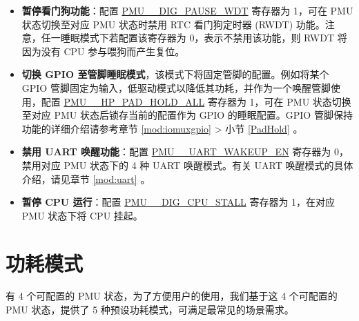 \documentclass[main\_\_CN.tex]{subfiles}
\begin{document}
\begin{itemize}
    \item \textbf{暂停看门狗功能}：配置 \hyperref[fielddesc:PMUHPACTIVEDIGPAUSEWDT]{PMU\_\_DIG\_PAUSE\_WDT} 寄存器为 1，可在 PMU 状态切换至对应 PMU 状态时禁用 RTC 看门狗定时器 (RWDT) 功能。注意，任一睡眠模式下若配置该寄存器为 0，表示不禁用该功能，则 RWDT 将因为没有 CPU 参与喂狗而产生复位。

    \item \textbf{切换 GPIO 至管脚睡眠模式}，该模式下将固定管脚的配置。例如将某个 GPIO 管脚固定为输入，低驱动模式以降低其功耗，并作为一个唤醒管脚使用，配置 \hyperref[fielddesc:PMUHPACTIVEHPPADHOLDALL]{PMU\_\_HP\_PAD\_HOLD\_ALL} 寄存器为 1，可在 PMU 状态切换至对应 PMU 状态后锁存当前的配置作为 GPIO 的睡眠配置。GPIO 管脚保持功能的详细介绍请参考章节 \ref{mod:iomuxgpio} \textit{} > 小节 \ref{PadHold} \textit{}。

    \item \textbf{禁用 UART 唤醒功能}：配置 \hyperref[fielddesc:PMUHPACTIVEUARTWAKEUPEN]{PMU\_\_UART\_WAKEUP\_EN} 寄存器为 0，禁用对应 PMU 状态下的 4 种 UART 唤醒模式。有关 UART 唤醒模式的具体介绍，请见章节 \ref{mod:uart} \textit{}。

    \item \textbf{暂停 CPU 运行}：配置 \hyperref[fielddesc:PMUHPACTIVEDIGCPUSTALL]{PMU\_\_DIG\_CPU\_STALL} 寄存器为 1，在对应 PMU 状态下将 CPU 挂起。
\end{itemize}

\section{功耗模式}

\chipname{} 有 4 个可配置的 PMU 状态，为了方便用户的使用，我们基于这 4 个可配置的 PMU 状态，提供了 5 种预设功耗模式，可满足最常见的场景需求。
\end{document}
